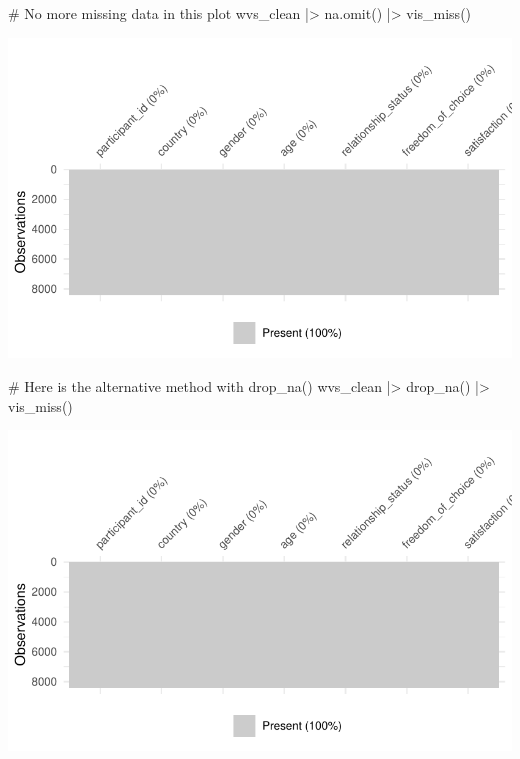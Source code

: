 \documentclass[
  letterpaper,
]{krantz}
\makeatletter
\newenvironment{Shaded}{\begin{snugshade}}{\end{snugshade}}
\newcommand{\CommentTok}[1]{\textcolor[rgb]{0.37,0.37,0.37}{#1}}
\newcommand{\FunctionTok}[1]{\textcolor[rgb]{0.28,0.35,0.67}{#1}}
\newcommand{\NormalTok}[1]{\textcolor[rgb]{0.00,0.23,0.31}{#1}}
\newcommand{\SpecialCharTok}[1]{\textcolor[rgb]{0.37,0.37,0.37}{#1}}
\newenvironment{kframe}{%
\medskip{}
\setlength{\fboxsep}{.8em}
 \def\at@end@of@kframe{}%
 \ifinner\ifhmode%
  \def\at@end@of@kframe{\end{minipage}}%
  \begin{minipage}{\columnwidth}%
 \fi\fi%
 \def\FrameCommand##1{\hskip\@totalleftmargin \hskip-\fboxsep
 \colorbox{shadecolor}{##1}\hskip-\fboxsep
     \hskip-\linewidth \hskip-\@totalleftmargin \hskip\columnwidth}%
 \MakeFramed {\advance\hsize-\width
   \@totalleftmargin\z@ \linewidth\hsize
   \@setminipage}}%
 {\par\unskip\endMakeFramed%
 \at@end@of@kframe}
\renewenvironment{Shaded}{\begin{kframe}}{\end{kframe}}
\makeatother
\begin{document}
\begin{Shaded}
\begin{Highlighting}[]
\CommentTok{\# No more missing data in this plot}
\NormalTok{wvs\_clean }\SpecialCharTok{|\textgreater{}} \FunctionTok{na.omit}\NormalTok{() }\SpecialCharTok{|\textgreater{}} \FunctionTok{vis\_miss}\NormalTok{()}
\end{Highlighting}
\end{Shaded}

\includegraphics{07_data_wrangling_files/figure-pdf/remove-all-missing-data-1.pdf}

\begin{Shaded}
\begin{Highlighting}[]
\CommentTok{\# Here is the alternative method with drop\_na()}
\NormalTok{wvs\_clean }\SpecialCharTok{|\textgreater{}} \FunctionTok{drop\_na}\NormalTok{() }\SpecialCharTok{|\textgreater{}} \FunctionTok{vis\_miss}\NormalTok{()}
\end{Highlighting}
\end{Shaded}

\includegraphics{07_data_wrangling_files/figure-pdf/alternative-of-removing-all-missing-data-points-1.pdf}
\end{document}
